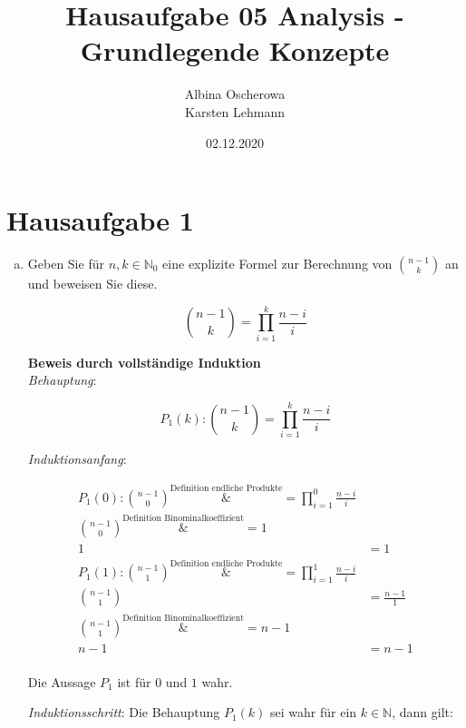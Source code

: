 \documentclass{article}
\author{Albina Oscherowa \\ Karsten Lehmann}
\date{02.12.2020}
\title{Hausaufgabe 05 Analysis - Grundlegende Konzepte}
\begin{document}
\maketitle
\newpage

\section*{Hausaufgabe 1}

\begin{enumerate}[a)]
\item
  Geben Sie für $n, k \in \mathbb{N}_0$ eine explizite Formel zur Berechnung von $\binom{n - 1}{k}$ an
  und beweisen Sie diese.

  \[
    \binom{n - 1}{k} = \prod\limits_{i=1}^k \frac{n - i}{i}
  \]

  \textbf{Beweis durch vollständige Induktion} \\
  \emph{Behauptung}:

  \[
    P_1(k) \colon \binom{n - 1}{k} = \prod\limits_{i=1}^k \frac{n - i}{i}
  \]

  \emph{Induktionsanfang}:

  \begin{align*}
    P_1(0) \colon \binom{n - 1}{0} \overset{\text{Definition endliche Produkte}}&= \prod\limits_{i=1}^0 \frac{n - i}{i} \\
    \binom{n - 1}{0} \overset{\text{Definition Binominalkoeffizient}}&= 1 \\
    1 &= 1 \\
    P_1(1) \colon \binom{n - 1}{1} \overset{\text{Definition endliche Produkte}}&= \prod\limits_{i=1}^1 \frac{n - i}{i} \\
    \binom{n - 1}{1} &= \frac{n - 1}{1} \\
    \binom{n - 1}{1} \overset{\text{Definition Binominalkoeffizient}}&= n - 1 \\
    n - 1 &= n - 1 \\
  \end{align*}

  Die Aussage $P_1$ ist für $0$ und $1$ wahr.

  \newpage
  \emph{Induktionsschritt}: Die Behauptung $P_1(k)$ sei wahr für ein $k \in \mathbb{N}$, dann gilt: 


\end{enumerate}
\end{document}
